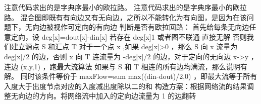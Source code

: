 {}注意代码求出的是字典序最小的欧拉路。\markdownRendererInterblockSeparator
{}\markdownRendererInterblockSeparator
{}
\markdownRendererSectionEnd \markdownRendererSectionBegin
{}\markdownRendererInterblockSeparator
{}注意代码求出的是字典序最小的欧拉路。\markdownRendererInterblockSeparator
{}\markdownRendererInterblockSeparator
{}
\markdownRendererSectionEnd \markdownRendererSectionBegin
{}\markdownRendererInterblockSeparator
{}混合图即既有有向边又有无向边，之所以不能转化为有向图，是因为在该问题下，无向边被视作可定向的有向边\markdownRendererParagraphSeparator
{}判断是否有欧拉回路：\markdownRendererParagraphSeparator
{}首先给每条无向边任意定向，设\markdownRendererDollarSign{} deg[x]=dout[x]-din[x] \markdownRendererDollarSign{}\markdownRendererParagraphSeparator
{}若存在\markdownRendererDollarSign{} deg[x]\markdownRendererAmpersand{}1 \markdownRendererDollarSign{}或者图不联通 直接无解\markdownRendererParagraphSeparator
{}否则我们建立源点\markdownRendererDollarSign{} S \markdownRendererDollarSign{}和汇点\markdownRendererDollarSign{} T \markdownRendererDollarSign{}\markdownRendererParagraphSeparator
{}对于一个点\markdownRendererDollarSign{} x \markdownRendererDollarSign{},如果\markdownRendererDollarSign{} deg[x]>0 \markdownRendererDollarSign{}，那么\markdownRendererDollarSign{} S \markdownRendererDollarSign{}向\markdownRendererDollarSign{} x \markdownRendererDollarSign{}流量为\markdownRendererDollarSign{} deg[x]/2 \markdownRendererDollarSign{}的边，否则\markdownRendererDollarSign{} x \markdownRendererDollarSign{}向\markdownRendererDollarSign{} T \markdownRendererDollarSign{}连流量为\markdownRendererDollarSign{} -deg[x]/2 \markdownRendererDollarSign{}的边，对于定向的无向边\markdownRendererDollarSign{} x->y \markdownRendererDollarSign{}，连边\markdownRendererDollarSign{} (x,y,1) \markdownRendererDollarSign{}，跑最大流算法\markdownRendererParagraphSeparator
{}如果与\markdownRendererDollarSign{} S \markdownRendererDollarSign{}和\markdownRendererDollarSign{} T \markdownRendererDollarSign{}相连的所有边均满流，那么说明有解。\markdownRendererParagraphSeparator
{}同时该条件等价于\markdownRendererDollarSign{} maxFlow=\markdownRendererBackslash{}sum max((din-dout)/2,0) \markdownRendererDollarSign{}，即最大流等于所有入度大于出度节点对应的入度减出度除以二的和\markdownRendererParagraphSeparator
{}构造方案：根据网络流的结果调整无向边的方向。将网络流中加入的定向边流量为\markdownRendererDollarSign{} 1 \markdownRendererDollarSign{}的边翻转\markdownRendererInterblockSeparator
